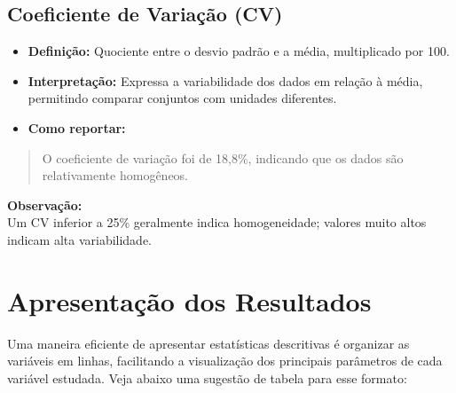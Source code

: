 \documentclass[
]{book}
\providecommand{\tightlist}{%
  \setlength{\itemsep}{0pt}\setlength{\parskip}{0pt}}
\begin{document}
\subsection{Coeficiente de Variação (CV)}\label{coeficiente-de-variauxe7uxe3o-cv}

\begin{itemize}
\tightlist
\item
  \textbf{Definição:} Quociente entre o desvio padrão e a média, multiplicado por 100.\\
\item
  \textbf{Interpretação:} Expressa a variabilidade dos dados em relação à média, permitindo comparar conjuntos com unidades diferentes.\\
\item
  \textbf{Como reportar:}
\end{itemize}

\begin{quote}
O coeficiente de variação foi de 18,8\%, indicando que os dados são relativamente homogêneos.
\end{quote}

\textbf{Observação:}\\
Um CV inferior a 25\% geralmente indica homogeneidade; valores muito altos indicam alta variabilidade.

\section{Apresentação dos Resultados}\label{apresentauxe7uxe3o-dos-resultados}

Uma maneira eficiente de apresentar estatísticas descritivas é organizar as variáveis em linhas, facilitando a visualização dos principais parâmetros de cada variável estudada. Veja abaixo uma sugestão de tabela para esse formato:
\end{document}
